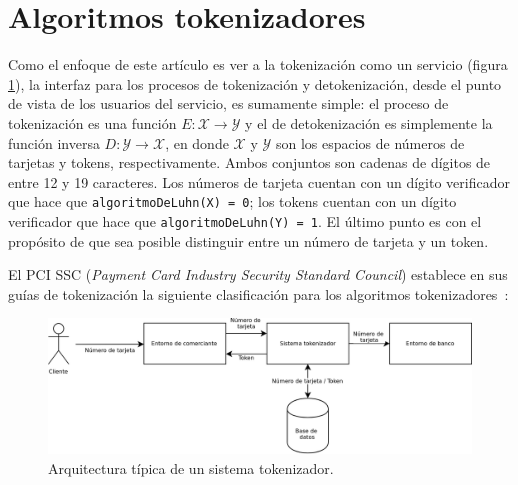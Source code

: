 %
%

\section{Algoritmos tokenizadores}

Como el enfoque de este artículo es ver a la tokenización como un servicio
(figura \ref{figura:arquitectura_tokenizacion}), la interfaz para los procesos
de tokenización y detokenización, desde el punto de vista de los usuarios del
servicio, es sumamente simple: el proceso de tokenización es una función $ E:
\mathcal{X} \rightarrow \mathcal{Y} $ y el de detokenización es  simplemente la
función inversa $ D: \mathcal{Y} \rightarrow \mathcal{X} $, en donde $
\mathcal{X} $ y $ \mathcal{Y} $ son los espacios de números de tarjetas y
tokens, respectivamente. Ambos conjuntos son cadenas de dígitos de entre 12 y 19
caracteres. Los números de tarjeta cuentan con un dígito verificador que hace
que \texttt{algoritmoDeLuhn(X) = 0}; los tokens cuentan con un dígito
verificador que hace que \texttt{algoritmoDeLuhn(Y) = 1}. El último punto es con
el propósito de que sea posible distinguir entre un número de tarjeta y un token.

El PCI SSC (\textit{Payment Card Industry Security Standard Council}) establece
en sus guías de tokenización la siguiente clasificación para los algoritmos
tokenizadores~\cite{pci_tokens}:

\begin{figure}
  \begin{center}
    \includegraphics[width=1.0\linewidth]{diagramas/sistema_tokenizador.png}
    \caption{Arquitectura típica de un sistema tokenizador.}
    \label{figura:arquitectura_tokenizacion}
  \end{center}
\end{figure}

